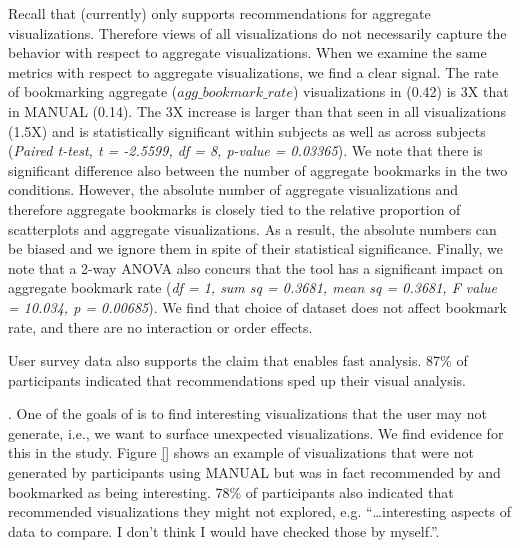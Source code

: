 Recall that \SeeDB (currently) only supports recommendations for aggregate visualizations.
Therefore views of all visualizations do not necessarily capture the behavior with respect to
aggregate visualizations.
When we examine the same metrics with respect to aggregate visualizations, we find a clear
signal.
The rate of bookmarking aggregate ($agg\_bookmark\_rate$) visualizations in \SeeDB (0.42) is 3X that
in MANUAL (0.14).
The 3X increase is larger than that seen in all visualizations (1.5X) and is statistically significant 
within subjects as well as across subjects ({\em Paired t-test, t = -2.5599, df = 8, p-value = 0.03365}).
We note that there is significant difference also between the number of aggregate bookmarks in the
two conditions.
However, the absolute number of aggregate visualizations and therefore aggregate bookmarks is closely
tied to the relative proportion of scatterplots and aggregate visualizations.
As a result, the absolute numbers can be biased and we ignore them in spite of their statistical
significance.
Finally, we note that a 2-way ANOVA also concurs that the tool has a significant impact on aggregate 
bookmark rate ({\em df = 1, sum sq = 0.3681, mean sq = 0.3681, F value = 10.034, p = 0.00685}). 
We find that choice of dataset does not affect bookmark rate, and there are no interaction or order effects.

User survey data also supports the claim that \SeeDB enables fast analysis.
87\% of participants indicated that \SeeDB recommendations sped up their visual analysis.

.
One of the goals of \SeeDB is to find interesting visualizations that the user may not generate, i.e.,
we want to surface unexpected visualizations.
We find evidence for this in the study.
Figure \ref{} shows an example of visualizations that were not generated by participants using MANUAL
but was in fact recommended by \SeeDB and bookmarked as being interesting.
78\% of participants also indicated that \SeeDB recommended visualizations they might not explored, e.g.
``\ldots interesting aspects of data to compare. I don't think I would have checked those by myself.''.


